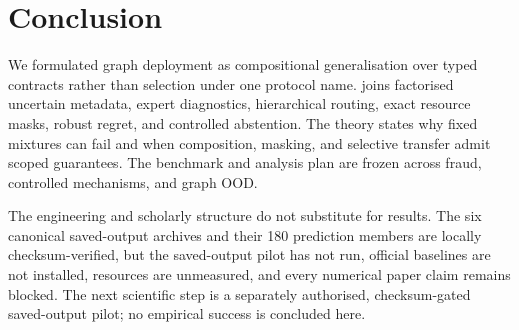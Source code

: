 \section{Conclusion}

We formulated graph deployment as compositional generalisation over typed contracts rather than selection under one protocol name. \method{} joins factorised uncertain metadata, expert diagnostics, hierarchical routing, exact resource masks, robust regret, and controlled abstention. The theory states why fixed mixtures can fail and when composition, masking, and selective transfer admit scoped guarantees. The benchmark and analysis plan are frozen across fraud, controlled mechanisms, and graph OOD.

The engineering and scholarly structure do not substitute for results. The six canonical saved-output archives and their 180 prediction members are locally checksum-verified, but the saved-output pilot has not run, official baselines are not installed, resources are unmeasured, and every numerical paper claim remains blocked. The next scientific step is a separately authorised, checksum-gated saved-output pilot; no empirical success is concluded here.
